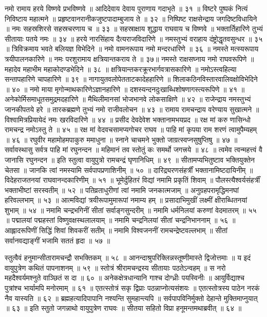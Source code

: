 नमो रामाय हरये विष्णवे प्रभविष्णवे ॥
आदिदेवाय देवाय पुराणाय गदाभृते ॥ ३१ ॥
विष्टरे पुष्पकं नित्यं निविष्टाय महात्मने ॥
प्रहृष्टवानरानीकजुष्टपादाम्बुजाय ते ॥ ३२ ॥
निष्पिष्ट राक्षसेन्द्राय जगदिष्टविधायिने ॥
नमः सहस्रशिरसे सहस्रचरणाय च ॥ ३३ ॥
सहस्राक्षाय शुद्धाय राघवाय च विष्णवे ॥
भक्तार्तिहारिणे तुभ्यं सीतायाः पतये नमः ॥ ३४ ॥
हरये नारसिंहाय दैत्यराजविदारिणे ॥
नमस्तुभ्यं वराहाय दंष्ट्रोद्धृतवसुन्धर ॥ ३५ ॥
त्रिविक्रमाय भवते बलियज्ञ विभेदिने ॥
नमो वामनरूपाय नमो मन्दरधारिणे ॥ ३६ ॥
नमस्ते मत्स्यरूपाय त्रयीपालनकारिणे ॥
नमः परशुरामाय क्षत्रियान्तकराय ते ॥ ३७॥
नमस्ते राक्षसघ्नाय नमो राघवरूपिणे ॥
महादेव महाभीम महाकोदण्डभेदिने ॥ ३८ ॥
क्षत्रियान्तकरक्रूरभार्गवत्रासकारिणे ॥
नमोऽस्त्वहिल्या सन्तापहारिणे चापहारिणे ॥ ३९ ॥
नागायुतवलोपेतताटकादेहहारिणे ॥
शिलाकठिनविस्तारवालिवक्षोविभेदिने ॥ ४० ॥
नमो माया मृगोन्माथकारिणेऽज्ञानहारिणे ॥
दशस्यन्दनदुःखाब्धिशोषणागस्त्यरूपिणे ॥ ४१ ॥
अनेकोर्मिसमाधूतसमुद्रमदहारिणे ॥
मैथिलीमानसां भोजभानवे लोकसाक्षिणे ॥ ४२ ॥
राजेन्द्राय नमस्तुभ्यं जानकीपतये हरे ॥
तारकब्रह्मणे तुभ्यं नमो राजीवलोचन ॥ ४३ ॥
रामाय रामचन्द्राय वरेण्याय सुखात्मने ॥
विश्वामित्रप्रियायेदं नमः खरविदारिणे ॥ ४४ ॥
प्रसीद देवदेवेश भक्तानामभयप्रद ॥
रक्ष मां करु णासिन्धो रामचन्द्र नमोऽस्तु ते ॥ ४५ ॥
रक्ष मां वेदवचसामप्यगोचर राघव ॥
पाहि मां कृपया राम शरणं त्वामुपैम्यहम् ॥ ४६ ॥
रघुवीर महामोहमपाकुरु ममाधुना ॥
स्नाने चाचमने भुक्तो जाग्रत्स्वप्नसुषुप्तिषु ॥ ४७ ॥
सर्वावस्थासु सर्वत्र पाहि मां रघुनन्दन ॥
महिमानं तव स्तोतुं कः समर्थो जगत्त्रये ॥ ४८ ॥
त्वमेव त्वन्महत्त्वं वै जानासि रघुनन्दन ॥
इति स्तुत्वा वायुपुत्रो रामचन्द्रं घृणानिधिम् ॥ ४९ ॥
सीतामप्यभितुष्टाव भक्तियुक्तेन चेतसा ॥
जानकि त्वां नमस्यामि सर्वपापप्रणाशिनीम् ॥ ५० ॥
दारिद्र्यरणसंहर्त्रीं भक्तानामिष्टदायिनीम् ॥
विदेहराजतनयां राघवानन्दकारिणीम् ॥ ५१ ॥
भूमेर्दुहितरं विद्यां नमामि प्रकृतिं शिवाम् ॥
पौलस्त्यैश्वर्यसंहर्त्रीं भक्ताभीष्टां सरस्वतीम् ॥ ५२ ॥
पतिव्रताधुरीणां त्वां नमामि जनकात्मजाम् ॥
अनुग्रहपरामृद्धिमनघां हरिवल्लभाम् ॥ ५३ ॥
आत्मविद्यां त्रयीरूपामुमारूपां नमाम्य हम् ॥
प्रसादाभिमुखीं लक्ष्मीं क्षीराब्धितनयां शुभाम् ॥ ५४ ॥
नमामि चन्द्रभगिनीं सीतां सर्वाङ्गसुन्दरीम् ॥
नमामि धर्मनिलयां करुणां वेदमातरम् ॥ ५५ ॥
पद्मालयां पद्महस्तां विष्णुवक्षस्थलालयाम् ॥
नमामि चन्द्रनिलयां सीतां चन्द्रनिभाननाम् ॥ ५६ ॥
आह्लादरूपिणीं सिद्धिं शिवां शिवकरीं सतीम् ॥
नमामि विश्वजननीं रामचन्द्रेष्टवल्लभाम् ॥
सीतां सर्वानवद्याङ्गीं भजामि सततं हृदा ॥ ५७ ॥

स्तुत्वैवं हनुमान्सीतारामचन्द्रौ सभक्तिकम् ॥ ५८ ॥
आनन्दाश्रुपरिक्लिन्नस्तूष्णीमास्ते द्विजोत्तमाः ॥
य इदं वायुपुत्रेण कथितं पापनाशनम् ॥ ५९ ॥
स्तोत्रं श्रीरामचन्द्रस्य सीतायाः पठतेऽन्वहम् ॥
स नरो महदैश्वर्यमश्नुते वाञ्छितं स दा ॥ ६० ॥
अनेकक्षेत्रधान्यानि गाश्च दोग्ध्रीः पयस्विनीः ॥
आयुर्विद्याश्च पुत्रांश्च भार्यामपि मनोरमाम् ॥ ६१ ॥
एतत्स्तोत्रं सकृ द्विप्राः पठन्नाप्नोत्यसंशयः ॥
एतत्स्तोत्रस्य पाठेन नरकं नैव यास्यति ॥ ६२ ॥
ब्रह्महत्यादिपापानि नश्यन्ति सुमहान्त्यपि ॥
सर्वपापविनिर्मुक्तो देहान्ते मुक्तिमाप्नुयात् ॥ ६३ ॥
इति स्तुतो जगन्नाथो वायुपुत्रेण राघवः ॥
सीतया सहितो विप्रा हनूमन्तमथाब्रवीत् ॥ ६४ ॥

